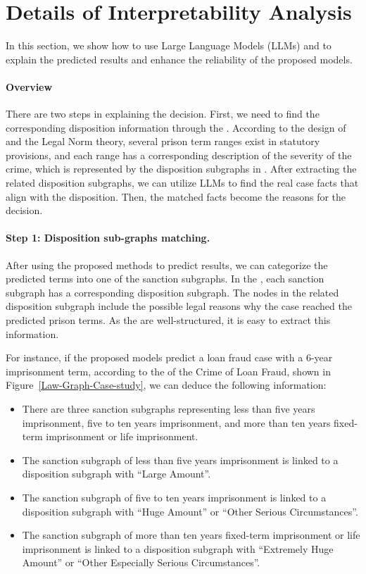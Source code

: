 \section{Details of Interpretability Analysis}
\label{sec:c}
In this section, we show how to use Large Language Models (LLMs) and \lawgraph{} to explain the predicted results and enhance the reliability of the proposed models.

\paragraph{Overview} There are two steps in explaining the decision. First, we need to find the corresponding disposition information through the . According to the design of \lawgraph{} and the Legal Norm theory, several prison term ranges exist in statutory provisions, and each range has a corresponding description of the severity of the crime, which is represented by the disposition subgraphs in . After extracting the related disposition subgraphs, we can utilize LLMs to find the real case facts that align with the disposition. Then, the matched facts become the reasons for the decision. 

\paragraph{Step 1: Disposition sub-graphs matching.} After using the proposed methods to predict results, we can categorize the predicted terms into one of the sanction subgraphs. In the , each sanction subgraph has a corresponding disposition subgraph. The nodes in the related disposition subgraph include the possible legal reasons why the case reached the predicted prison terms. As the  are well-structured, it is easy to extract this information.

For instance, if the proposed models predict a loan fraud case with a 6-year imprisonment term, according to the \lawgraph{} of the Crime of Loan Fraud, shown in Figure~\ref{Law-Graph-Case-study}, we can deduce the following information:
\begin{itemize}
    \item There are three sanction subgraphs representing less than five years imprisonment, five to ten years imprisonment, and more than ten years fixed-term imprisonment or life imprisonment.
    \item The sanction subgraph of less than five years imprisonment is linked to a disposition subgraph with ``Large Amount''.
    \item The sanction subgraph of five to ten years imprisonment is linked to a disposition subgraph with ``Huge Amount'' or ``Other Serious Circumstances''.
    \item The sanction subgraph of more than ten years fixed-term imprisonment or life imprisonment is linked to a disposition subgraph with ``Extremely Huge Amount'' or ``Other Especially Serious Circumstances''.
\end{itemize}

